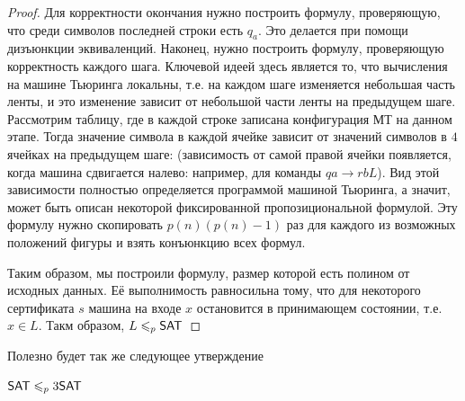 \begin{proof}
Для корректности окончания нужно построить формулу, проверяющую, что среди символов последней строки есть $q_a$. Это делается при помощи дизъюнкции эквиваленций. Наконец, нужно построить формулу, проверяющую корректность каждого шага. Ключевой идеей здесь является то, что вычисления на машине Тьюринга локальны, т.е. на каждом шаге изменяется небольшая часть ленты, и это изменение зависит от небольшой части ленты на предыдущем шаге. Рассмотрим таблицу, где в каждой строке записана конфигурация МТ на данном этапе. Тогда значение символа в каждой ячейке зависит от значений символов в $4$ ячейках
на предыдущем шаге: 
 (зависимость от самой правой ячейки появляется, когда машина сдвигается налево: например, 
 для команды $qa \rightarrow rbL$). Вид этой зависимости полностью определяется программой машиной Тьюринга, а значит, может быть описан некоторой фиксированной пропозициональной формулой. Эту формулу нужно скопировать $p(n)(p(n) - 1)$ раз для каждого из возможных положений фигуры 
 и взять конъюнкцию всех формул.

Таким образом, мы построили формулу, размер которой есть полином от исходных данных. Её выполнимость равносильна тому, что для некоторого сертификата $s$ машина на входе $x$ остановится в принимающем состоянии, т.е. $x \in L$. Такм образом, $L \leqslant_p \mathsf{SAT}$ \end{proof}

Полезно будет так же следующее утверждение

\begin{statement} $\mathsf{SAT} \leqslant_p 3\mathsf{SAT}$
\end{statement}

